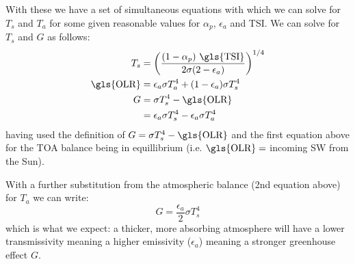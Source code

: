 \noindent With these we have a set of simultaneous equations with which we can solve for $T_s$ and $T_a$ for some given
reasonable values for $\alpha_p$, $\epsilon_a$ and \gls{TSI}. We can solve for $T_s$ and $G$ as follows:
\begin{equation}
    \begin{aligned}
    T_s &= \left(\frac{(1 - \alpha_p)\ \text{\gls{TSI}}}{2 \sigma (2 - \epsilon_a)}\right)^{1/4} \\
    \text{\gls{OLR}} &=  \epsilon_a \sigma T_a^4 + (1 - \epsilon_a)\sigma T_s^4 \\
    G &= \sigma T_s^4 - \text{\gls{OLR}}\\
    &= \epsilon_a \sigma T_s^4 - \epsilon_a \sigma T_a^4
    \end{aligned}
    \nonumber
\end{equation}
having used the definition of $G = \sigma T_s^4 - \text{\gls{OLR}}$ and the first equation above for the 
\gls{TOA} balance being in equillibrium (i.e. $\text{\gls{OLR}} = $ incoming \gls{SW} from the
Sun).

With a further substitution from the atmospheric balance (2nd equation above) for $T_a$ we can write:
$$
\boxed{
G = \frac{\epsilon_a}{2} \sigma T_s^4
}
$$
which is what we expect: a thicker, more absorbing atmosphere will have a lower \gls{transmissivity}
meaning a higher \gls{emissivity} ($\epsilon_a$) meaning a stronger greenhouse effect $G$.